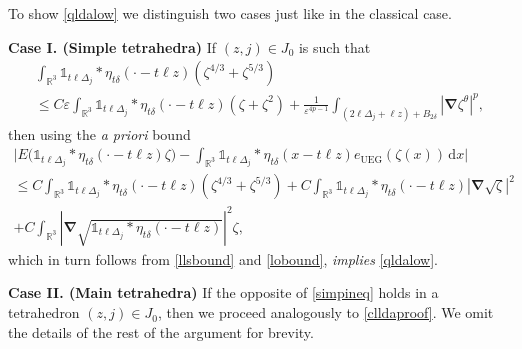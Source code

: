 \documentclass[final,onefignum,onetabnum,reqno]{amsart}
\theoremstyle{remark}
\renewcommand{\le}{\leqslant}
\renewcommand{\epsilon}{\varepsilon}
\newcommand{\RR}{\mathbb{R}}
\newcommand{\UEG}{\mathrm{UEG}} %
\newcommand{\iden}{\mathbb{1}} %
\newcommand{\grad}{\bm{\nabla}} %
\newcommand{\tetra}{\mathbb{\Delta}} %
\newcommand{\dd}{\mathrm{d}} %
\begin{document}
To show \cref{qldalow} we distinguish two cases just like in the classical case.

\noindent\textbf{Case I. (Simple tetrahedra)} If $(z,j)\in J_0$ is such that
\begin{multline}\label{simpineq}
\int_{\RR^3} \iden_{t\ell\tetra_j}*\eta_{t\delta}(\cdot-t\ell z)(\zeta^{4/3}+\zeta^{5/3})\\\le C\epsilon\int_{\RR^3} \iden_{t\ell\tetra_j}*\eta_{t\delta}(\cdot-t\ell z)(\zeta+\zeta^2) + \frac{1}{\epsilon^{4p-1}} \int_{(2\ell\tetra_j+\ell z)+B_{2\delta}} |\grad\zeta^\theta|^p,
\end{multline}
then using the \emph{a priori} bound
\begin{multline*}
\Biggl| E\bigl(\iden_{t\ell\tetra_j} * \eta_{t\delta}(\cdot-t\ell z)\zeta) - \int_{\RR^3} \iden_{t\ell\tetra_j}*\eta_{t\delta}(x-t\ell z)e_\UEG(\zeta(x))\, \dd x \Biggr|\\
\le C\int_{\RR^3} \iden_{t\ell\tetra_j}*\eta_{t\delta}(\cdot-t\ell z)(\zeta^{4/3}+\zeta^{5/3}) + C\int_{\RR^3} \iden_{t\ell\tetra_j}*\eta_{t\delta}(\cdot-t\ell z) |\grad\sqrt{\zeta}|^2\\
+C\int_{\RR^3} \left|\grad\sqrt{\iden_{t\ell\tetra_j}*\eta_{t\delta}(\cdot-t\ell z)}\right|^2 \zeta,
\end{multline*}
which in turn follows from \cref{llsbound} and \cref{lobound}, \emph{implies} 
\cref{qldalow}.

\noindent\textbf{Case II. (Main tetrahedra)} If the opposite of \cref{simpineq} holds in 
a tetrahedron $(z,j)\in J_0$, then we proceed analogously to \cref{clldaproof}.
We omit the details of the rest of the argument for brevity.

\end{document}
